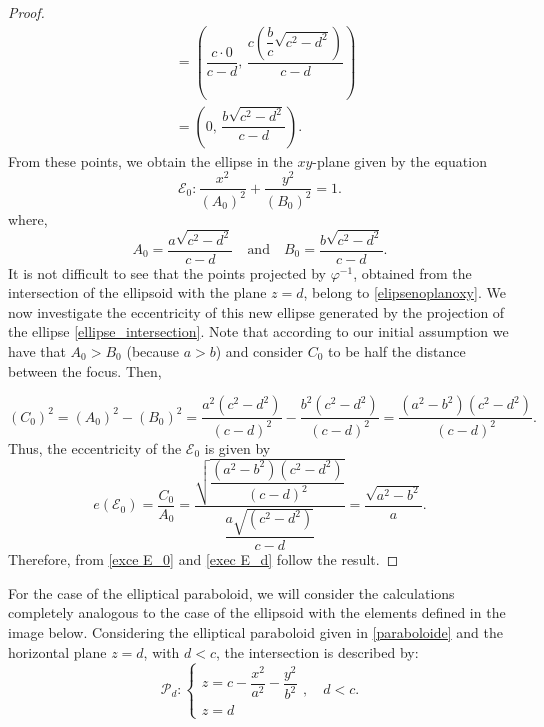 \documentclass{amsart}
\theoremstyle{plain}
\numberwithin{equation}{section}
\begin{document}
\begin{proof}
\begin{align*}
		&= \left( \dfrac{c \cdot 0}{c - d},\, \dfrac{c \left( \dfrac{b}{c} \sqrt{c^2 - d^2} \right)}{c - d} \right)\\
		&= \left( 0,\, \dfrac{b \sqrt{c^2 - d^2}}{c - d} \right).
	\end{align*}
	From these points, we obtain the ellipse in the \( xy \)-plane given by the equation
	\begin{equation}\label{elipsenoplanoxy}
		\mathcal{E}_0 :   \dfrac{x^2}{(A_0)^2} + \dfrac{y^2}{(B_0)^2} = 1.
	\end{equation}
	where, 
	\begin{equation}\label{A_0 e B_0}
		A_0 = \dfrac{a \sqrt{c^2 - d^2}}{c - d} \quad \text{and} \quad B_0 = \dfrac{b \sqrt{c^2 - d^2}}{c - d}.
	\end{equation}
	It is not difficult to see that the points projected by \( \varphi^{-1} \), obtained from the intersection of the ellipsoid with the plane \( z = d \), belong to \eqref{elipsenoplanoxy}. We now investigate the eccentricity of this new ellipse generated by the projection of the ellipse \eqref{ellipse_intersection}. Note that according to our initial assumption we have that $A_0 > B_0$ (because $a > b$) and consider \( C_0 \) to be half the distance between the focus. Then,
	
	\begin{equation}\label{valor de C'}
		(C_0)^2 = (A_0)^2 - (B_0)^2 = \dfrac{a^2(c^2 - d^2)}{(c - d)^2} - \dfrac{b^2(c^2 - d^2)}{(c - d)^2} = \dfrac{(a^2 - b^2)(c^2 - d^2)}{(c - d)^2}.
	\end{equation}
	Thus, the eccentricity of the $\mathcal{E}_0$ is given by 
	\begin{equation}\label{exce E_0}
		e(\mathcal{E}_0) = \dfrac{C_0}{A_0} = \dfrac{ \sqrt{\dfrac{(a^2 - b^2)(c^2 - d^2)}{(c - d)^2}} }{\dfrac{a \sqrt{(c^2 - d^2)}}{c - d}} = \dfrac{\sqrt{a^2 - b^2}}{a}.
	\end{equation}
	Therefore, from \eqref{exce E_0} and \eqref{exec E_d} follow the result.
	
\end{proof}


For the case of the elliptical paraboloid, we will consider the calculations completely analogous to the case of the ellipsoid with the elements defined in the image below. Considering the elliptical paraboloid given in \eqref{paraboloide} and the horizontal plane \( z = d \), with \( d < c \), the intersection is described by:
\begin{equation*}
	\mathcal{P}_d: 
	\begin{cases}
		z = c - \dfrac{x^2}{a^2} - \dfrac{y^2}{b^2} \\
		z = d
	\end{cases}, \quad d < c.
\end{equation*}
\end{document}
